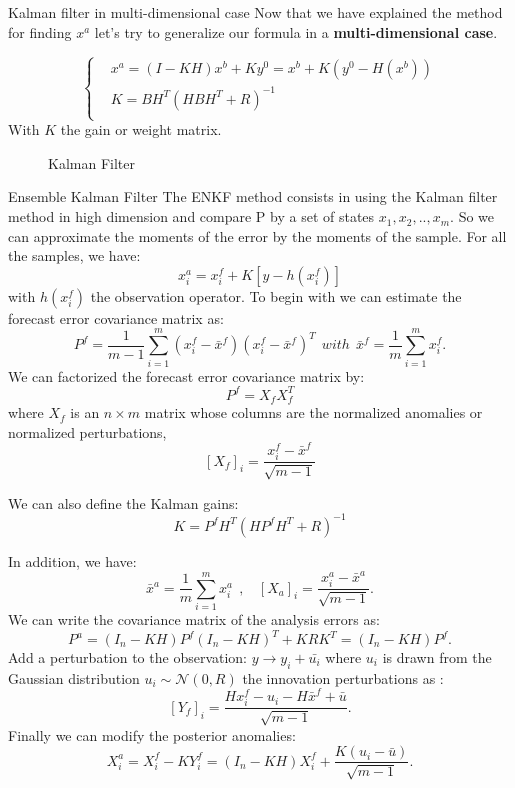 \begin{frame}{Kalman filter in multi-dimensional case}
   Now that we have explained the method for finding $x^a$ let's try to generalize our formula in a \textbf{multi-dimensional case}.

   $$\left\{\begin{aligned}
     &x^a=(I-KH)x^b+Ky^0=x^b+K(y^0-H(x^b)) \\
           &K=BH^T(HBH^T+R)^{-1} \\
    \end{aligned}\right.$$
   With $K$ the gain or weight matrix.
   \begin{figure}[H]
       \caption{Kalman Filter}
   \end{figure}
\end{frame}
\begin{frame}[allowframebreaks]{Ensemble Kalman Filter}
   \noindent The ENKF method consists in using the Kalman filter method in high dimension and compare P by a set of states $x_1,x_2,..,x_{m}$. So we can approximate the moments of the error by the moments of the sample.
For all the samples, we have:
$$x_i^a=x_i^f+K[y-h(x_i^f)]$$
with $h(x_i^f)$ the observation operator.
\newline \noindent To begin with we can estimate the
forecast error covariance matrix as:
$$P^f=\frac{1}{m-1}\sum_{i=1}^{m}(x_i^f-\bar{x}^f)(x_i^f-\bar{x}^f)^T~~with~~\bar{x}^f=\frac{1}{m}\sum_{i=1}^{m}x_i^f .$$ 
\noindent We can factorized the forecast error covariance matrix by:
$$P^f=X_f X_f^T$$
where $X_f$ is an $n \times m$ matrix whose columns are the normalized anomalies or normalized perturbations,
$$[X_f]_i=\frac{x_i^f-\bar{x}^f}{\sqrt{m-1}}$$

\noindent We can also define the Kalman gains: 
$$K=P^f H^T(HP^f H^T+R)^{-1}$$

\noindent In addition, we have:
$$
\bar{x}^a=\frac{1}{m}\sum_{i=1}^mx_i^a~~,~~~~[X_a]_i=\frac{x_i^a-\bar{x}^a}{\sqrt{m-1}}. $$
\newline \noindent We can write the covariance matrix of the analysis errors as:
$$P^a=(I_n-KH)P^f(I_n-KH)^T+KRK^T=(I_n-KH)P^f.$$
\noindent Add a perturbation to the observation: $y\rightarrow y_i+\bar{u_i}$ where $u_i$ is drawn from the Gaussian distribution $u_i \sim \mathcal{N}(0,R)$
\newline the innovation perturbations as :
$$[Y_f]_i=\frac{Hx_i^f-u_i-H\bar{x}^f+\bar{u}}{\sqrt{m-1}}.$$
\noindent Finally we can modify the posterior anomalies:
$$X_i^a=X_i^f-KY_i^f=(I_n-KH)X_i^f+\frac{K(u_i-\bar{u})}{\sqrt{m-1}}.$$
\end{frame}
